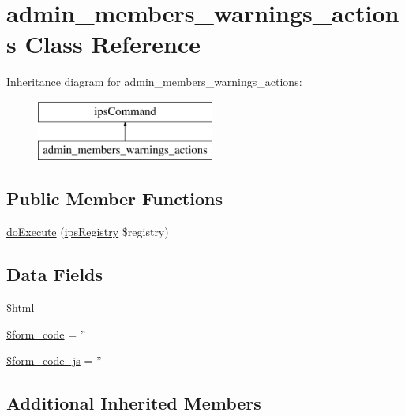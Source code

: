\hypertarget{classadmin__members__warnings__actions}{\section{admin\-\_\-members\-\_\-warnings\-\_\-actions Class Reference}
\label{classadmin__members__warnings__actions}
}
Inheritance diagram for admin\-\_\-members\-\_\-warnings\-\_\-actions\-:\begin{figure}[H]
\begin{center}
\leavevmode
\includegraphics[height=2.000000cm]{classadmin__members__warnings__actions}
\end{center}
\end{figure}
\subsection*{Public Member Functions}
\begin{DoxyCompactItemize}
\item 
\hyperlink{classadmin__members__warnings__actions_afbc4e912a0604b94d47d66744c64d8ba}{do\-Execute} (\hyperlink{classips_registry}{ips\-Registry} \$registry)
\end{DoxyCompactItemize}
\subsection*{Data Fields}
\begin{DoxyCompactItemize}
\item 
\hyperlink{classadmin__members__warnings__actions_a6f96e7fc92441776c9d1cd3386663b40}{\$html}
\item 
\hyperlink{classadmin__members__warnings__actions_af28aee726fa3eb6c355d08a2ab655e03}{\$form\-\_\-code} = ''
\item 
\hyperlink{classadmin__members__warnings__actions_ac68fe8a02a2efd63c3271179f4b4fbb7}{\$form\-\_\-code\-\_\-js} = ''
\end{DoxyCompactItemize}
\subsection*{Additional Inherited Members}


